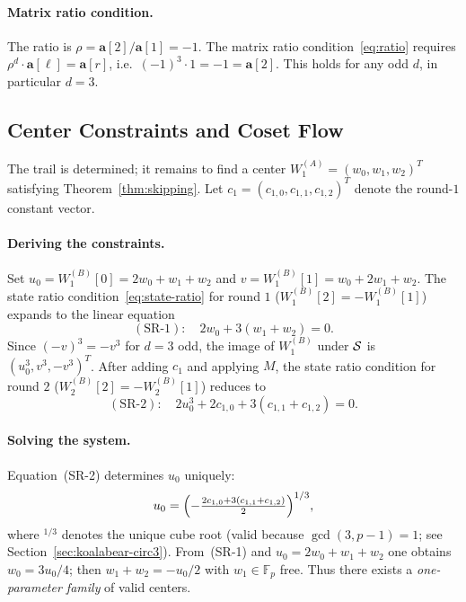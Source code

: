 \documentclass[11pt]{article}
\begin{document}
\paragraph{Matrix ratio condition.}
The ratio is $\rho=\mathbf{a}[2]/\mathbf{a}[1]=-1$.  The matrix ratio condition~\eqref{eq:ratio}
requires $\rho^d\cdot\mathbf{a}[\ell]=\mathbf{a}[r]$, i.e.\
$(-1)^3\cdot 1=-1=\mathbf{a}[2]$.  This holds for any odd $d$, in particular $d=3$. \checkmark

\subsection{Center Constraints and Coset Flow}\label{sec:center-circ3}

The trail is determined; it remains to find a center
$W_1^{(A)}=(w_0,w_1,w_2)^T$ satisfying Theorem~\ref{thm:skipping}.
Let $c_1=(c_{1,0},c_{1,1},c_{1,2})^T$ denote the round-$1$ constant vector.

\paragraph{Deriving the constraints.}
Set $u_0=W_1^{(B)}[0]=2w_0+w_1+w_2$ and $v=W_1^{(B)}[1]=w_0+2w_1+w_2$.
The state ratio condition~\eqref{eq:state-ratio} for round $1$
($W_1^{(B)}[2]=-W_1^{(B)}[1]$) expands to the linear equation
\begin{equation}\label{eq:sr1}
    \mathrm{(SR\text{-}1)}:\quad 2w_0+3(w_1+w_2)=0.
\end{equation}
Since $(-v)^3=-v^3$ for $d=3$ odd, the image of $W_1^{(B)}$ under $\mathcal{S}$ is
$(u_0^3,v^3,-v^3)^T$.  After adding $c_1$ and applying $M$, the state ratio
condition for round $2$ ($W_2^{(B)}[2]=-W_2^{(B)}[1]$) reduces to
\begin{equation}\label{eq:sr2}
    \mathrm{(SR\text{-}2)}:\quad 2u_0^3+2c_{1,0}+3(c_{1,1}+c_{1,2})=0.
\end{equation}

\paragraph{Solving the system.}
Equation~(SR-2) determines $u_0$ uniquely:
\begin{equation}\label{eq:u0}
    u_0 = \Bigl(-\tfrac{2c_{1,0}+3(c_{1,1}+c_{1,2})}{2}\Bigr)^{1/3},
\end{equation}
where $^{1/3}$ denotes the unique cube root (valid because $\gcd(3,p-1)=1$;
see Section~\ref{sec:koalabear-circ3}).  From~(SR-1) and $u_0=2w_0+w_1+w_2$
one obtains $w_0=3u_0/4$; then $w_1+w_2=-u_0/2$ with $w_1\in\mathbb{F}_p$
free.  Thus there exists a \emph{one-parameter family} of valid centers.
\end{document}
